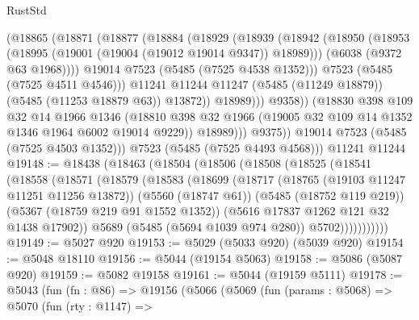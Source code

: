 \begin{lexlean}{RustStd}
\begin{coremodule}
                      (@18865
                        (@18871
                          (@18877
                            (@18884
                              (@18929
                                (@18939
                                  (@18942
                                    (@18950
                                      (@18953
                                        (@18995 (@19001 (@19004 (@19012 @19014 @9347)) @18989)))
                                      (@6038 (@9372 @63 @1968))))
                                  @19014
                                  @7523
                                  (@5485 (@7525 @4538 @1352)))
                                @7523
                                (@5485 (@7525 @4511 @4546)))
                              @11241
                              @11244
                              @11247
                              (@5485 (@11249 @18879))
                              (@5485 (@11253 @18879 @63))
                              @13872))
                          @18989)))
                    @9358))
                (@18830
                  @398
                  @109
                  @32
                  @14
                  @1966
                  @1346
                  (@18810 @398 @32 @1966 (@19005 @32 @109 @14 @1352 @1346 @1964 @6002 @19014 @9229))
                  @18989)))
            @9375))
        @19014
        @7523
        (@5485 (@7525 @4503 @1352)))
      @7523
      (@5485 (@7525 @4493 @4568)))
    @11241
    @11244
@19148 := @18438
    (@18463
      (@18504
        (@18506
          (@18508
            (@18525
              (@18541
                (@18558
                  (@18571
                    (@18579
                      (@18583
                        (@18699
                          (@18717
                            (@18765 (@19103 @11247 @11251 @11256 @13872))
                            (@5560 (@18747 @61))
                            (@5485 (@18752 @119 @219))
                            (@5367 (@18759 @219 @91 @1552 @1352))
                            (@5616 @17837 @1262 @121 @32 @1438 @17902))
                          @5689
                          (@5485 (@5694 @1039 @974 @280))
                          @5702)))))))))))
@19149 := @5027 @920
@19153 := @5029 (@5033 @920) (@5039 @920)
@19154 := @5048 @18110
@19156 := @5044 (@19154 @5063)
@19158 := @5086 (@5087 @920)
@19159 := @5082 @19158
@19161 := @5044 (@19159 @5111)
@19178 := @5043
    (fun (fn : @86) =>
    @19156
      (@5066
        (@5069
          (fun (params : @5068) =>
          @5070
            (fun (rty : @1147) =>

\end{coremodule}
\end{lexlean}
